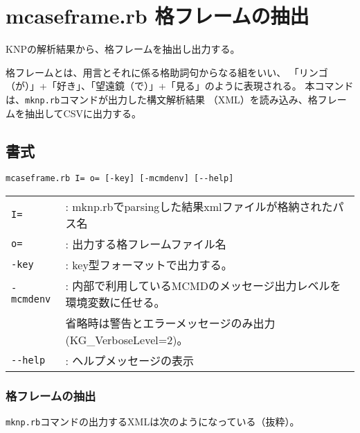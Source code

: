 



\section{mcaseframe.rb 格フレームの抽出\label{sect:mcaseframe}}

KNPの解析結果から、格フレームを抽出し出力する。

格フレームとは、用言とそれに係る格助詞句からなる組をいい、
「リンゴ（が）」+「好き」、「望遠鏡（で）」+「見る」のように表現される。
本コマンドは、\verb|mknp.rb|コマンドが出力した構文解析結果
（XML）を読み込み、格フレームを抽出してCSVに出力する。

\subsection{書式}
\begin{verbatim}
mcaseframe.rb I= o= [-key] [-mcmdenv] [--help]
\end{verbatim}

\begin{table}[htbp]
{\small
\begin{tabular}{ll}
\verb|I=|        & : mknp.rbでparsingした結果xmlファイルが格納されたパス名 \\
\verb|o=|        & : 出力する格フレームファイル名 \\
\verb|-key|      & : key型フォーマットで出力する。 \\
\verb|-mcmdenv|  & : 内部で利用しているMCMDのメッセージ出力レベルを環境変数に任せる。 \\
                 &   省略時は警告とエラーメッセージのみ出力(KG\_VerboseLevel=2)。 \\
\verb|--help|    & : ヘルプメッセージの表示 \\
\end{tabular} 
}
\end{table} 

\subsubsection{格フレームの抽出}

\verb|mknp.rb|コマンドの出力するXMLは次のようになっている（抜粋）。

